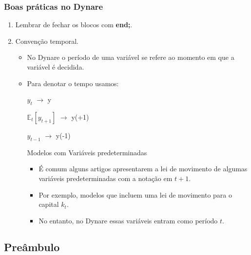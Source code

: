 \documentclass[xcolor=pdftex,dvipsnames,table]{beamer}
\newcommand{\ft}{\frametitle}
\begin{document}
\begin{frame}[fragile]
\ft{Boas práticas no Dynare}

\begin{enumerate}
\item Lembrar de fechar os blocos com \textbf{end;}.

\item Convenção temporal.

\begin{itemize}
\item No Dynare o período de uma variável se refere ao momento em que a variável é decidida.

\item Para denotar o tempo usamos:

$y_t$  $\longrightarrow$  y

$\mathbb{E}_t[y_{t+1}]$ $\longrightarrow$ y(+1)

$y_{t-1}$  $\longrightarrow$ y(-1)


\begin{block}{Modelos com Variáveis predeterminadas}

\begin{itemize}
\item É comum alguns artigos apresentarem a lei de movimento de algumas variáveis predeterminadas com a notação em $t+1$.

\item Por exemplo, modelos que incluem uma lei de movimento para o capital $k_t$.

\item No entanto, no Dynare essas variáveis entram como período $t$.
\end{itemize}
\end{block}

\end{itemize}
\end{enumerate}

\end{frame}


\subsection{Preâmbulo}
\end{document}
